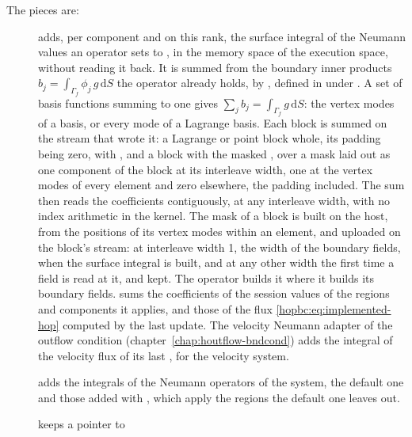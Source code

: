 The pieces are:
\begin{description}
  \item[] adds,
    per component and on this rank, the surface integral of the Neumann
    values an operator sets to , in the memory space of the
    execution space, without reading it back. It is summed from the boundary
    inner products \(b_j=\int_{\Gamma_f}\phi_j\,g\,\mathrm dS\) the operator
    already holds, by , defined in
     under
    . A set
    of basis functions summing to one gives
    \(\sum_j b_j=\int_{\Gamma_f}g\,\mathrm dS\): the vertex modes of a
     basis, or every mode of a Lagrange basis. Each block
    is summed on the stream that wrote it: a Lagrange or point block whole,
    its padding being zero, with , and a
     block with the masked ,
    over a  mask laid out as one component of the block at
    its interleave width, one at the vertex modes of every element and zero
    elsewhere, the padding included. The sum then reads the coefficients
    contiguously, at any interleave width, with no index arithmetic in the
    kernel. The mask of a block is built on the host, from the positions of
    its vertex modes within an element, and uploaded on the block's stream:
    at interleave width 1, the width of the boundary fields, when the
    surface integral is built, and at any other width the first time a field
    is read at it, and kept.
    The operator builds it where it builds its boundary fields.
     sums the
    coefficients of the session values of the regions and components it
    applies, and  those of the flux
    \eqref{hopbc:eq:implemented-hop} computed by the last update. The
    velocity Neumann adapter of the outflow condition
    (chapter~\ref{chap:houtflow-bndcond}) adds the integral of the
    velocity flux of its last , for the velocity system.
  \item[] adds
    the integrals of the Neumann operators of the system, the default one and
    those added with , which apply the regions the
    default one leaves out.
  \item[] keeps a pointer to

\end{description}
